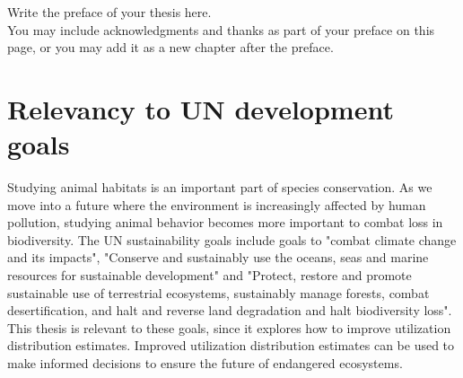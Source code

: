 
Write the preface of your thesis here. \\

\noindent You may include acknowledgments and thanks as part of your preface on this page, or you may add it as a new chapter after the preface.









\section{Relevancy to UN development goals}
Studying animal habitats is an important part of species conservation. As we move into a future where the environment is increasingly affected by human pollution, studying animal behavior becomes more important to combat loss in biodiversity. The UN sustainability goals include goals to "combat climate change and its impacts", "Conserve and sustainably use the oceans, seas and marine resources for sustainable development" and "Protect, restore and promote sustainable use of terrestrial ecosystems, sustainably manage forests, combat desertification, and halt and reverse land degradation and halt biodiversity loss"\parencite{UN_goals}. This thesis is relevant to these goals, since it explores how to improve utilization distribution estimates. Improved utilization distribution estimates can be used to make informed decisions to ensure the future of endangered ecosystems.







